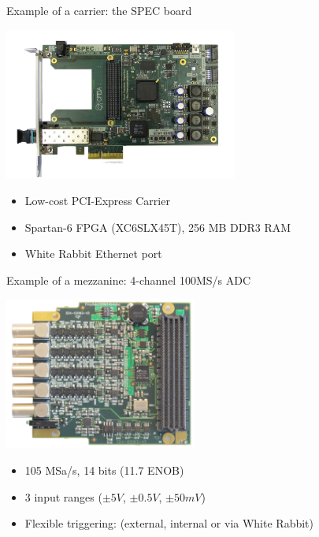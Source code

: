 \documentclass[compress,red]{beamer}
\begin{document}
\begin{frame}{Example of a carrier: the SPEC board}
\begin{center}
\includegraphics[height=5cm]{../../figures/node/spec_photo.jpg}
\begin{itemize}
\item Low-cost PCI-Express Carrier
\item Spartan-6 FPGA (XC6SLX45T), 256 MB DDR3 RAM
\item White Rabbit Ethernet port
\end{itemize}
\end{center}
\end{frame}

\begin{frame}{Example of a mezzanine: 4-channel 100MS/s ADC}
\begin{center}
\includegraphics[height=5cm]{../../figures/node/adc.jpg}
\begin{itemize}
\item 105 MSa/s, 14 bits (11.7 ENOB)
\item 3 input ranges ($\pm5V$, $\pm0.5V$, $\pm50mV$)
\item Flexible triggering: (external, internal or via White Rabbit)
\end{itemize}
\end{center}
\end{frame}


\end{document}
